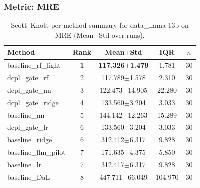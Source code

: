 \subsubsection*{Metric: MRE}
\begin{table}[H]
\centering
\scriptsize
\setlength{\tabcolsep}{4pt}
\renewcommand{\arraystretch}{1.1}
\caption{Scott--Knott per-method summary for data\_llama-13b on MRE (Mean$\pm$Std over runs).}
\label{tab:sk_data_llama-13b_MRE}
\begin{tabular}{l|c|c|c|c}
\hline
\textbf{Method} & \textbf{Rank} & \textbf{Mean$\pm$Std} & \textbf{IQR} & \textbf{$n$} \\
\hline
\rowcolor{red!15} baseline\_rf\_light & \textbf{1} & \textbf{117.326$\pm$1.479} & 1.781 & 30 \\
dcpl\_gate\_rf & 2 & 117.789$\pm$1.578 & 2.310 & 30 \\
dcpl\_gate\_nn & 3 & 122.473$\pm$14.905 & 22.280 & 30 \\
dcpl\_gate\_ridge & 4 & 133.560$\pm$3.204 & 3.033 & 30 \\
baseline\_nn & 5 & 144.142$\pm$12.263 & 15.289 & 30 \\
dcpl\_gate\_lr & 6 & 133.560$\pm$3.204 & 3.033 & 30 \\
baseline\_ridge & 6 & 312.412$\pm$6.317 & 9.828 & 30 \\
baseline\_llm\_pilot & 7 & 171.635$\pm$4.375 & 5.850 & 30 \\
baseline\_lr & 7 & 312.417$\pm$6.317 & 9.828 & 30 \\
baseline\_DaL & 8 & 447.711$\pm$66.049 & 104.970 & 30 \\
\hline
\end{tabular}
\end{table}
